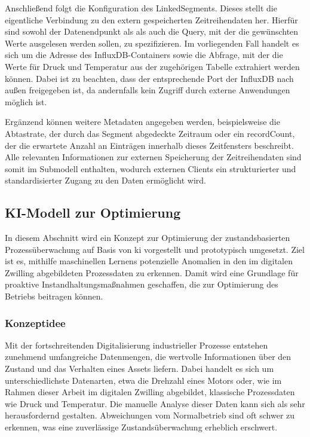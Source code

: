 Anschließend folgt die Konfiguration des LinkedSegments. 
Dieses stellt die eigentliche Verbindung zu den extern gespeicherten Zeitreihendaten her.
Hierfür sind sowohl der Datenendpunkt als als auch die Query, mit der die gewünschten Werte ausgelesen werden sollen, zu spezifizieren.
Im vorliegenden Fall handelt es sich um die Adresse des InfluxDB-Containers sowie die Abfrage, mit der die Werte für Druck und Temperatur aus der zugehörigen Tabelle extrahiert werden können.
Dabei ist zu beachten, dass der entsprechende Port der InfluxDB nach außen freigegeben ist, da andernfalls kein Zugriff durch externe Anwendungen möglich ist.

Ergänzend können weitere Metadaten angegeben werden, beispielsweise die Abtastrate, der durch das Segment abgedeckte Zeitraum oder ein recordCount, der die erwartete Anzahl an Einträgen innerhalb dieses Zeitfensters beschreibt.
Alle relevanten Informationen zur externen Speicherung der Zeitreihendaten sind somit im Submodell enthalten, wodurch externen Clients ein strukturierter und standardisierter Zugang zu den Daten ermöglicht wird.

\newpage
\subsection{KI-Modell zur Optimierung}
In diesem Abschnitt wird ein Konzept zur Optimierung der zustandsbasierten Prozessüberwachung auf Basis von \acs{ki} vorgestellt und prototypisch umgesetzt.
Ziel ist es, mithilfe maschinellen Lernens potenzielle Anomalien in den im digitalen Zwilling abgebildeten Prozessdaten zu erkennen.
Damit wird eine Grundlage für proaktive Instandhaltungsmaßnahmen geschaffen, die zur Optimierung des Betriebs beitragen können.



\subsubsection{Konzeptidee}
Mit der fortschreitenden Digitalisierung industrieller Prozesse entstehen zunehmend umfangreiche Datenmengen, die wertvolle Informationen über den Zustand und das Verhalten eines Assets liefern. 
Dabei handelt es sich um unterschiedlichste Datenarten, etwa die Drehzahl eines Motors oder, wie im Rahmen dieser Arbeit im digitalen Zwilling abgebildet, klassische Prozessdaten wie Druck und Temperatur.
Die manuelle Analyse dieser Daten kann sich als sehr herausfordernd gestalten. Abweichungen vom Normalbetrieb sind oft schwer zu erkennen, was eine zuverlässige Zustandsüberwachung erheblich erschwert.

